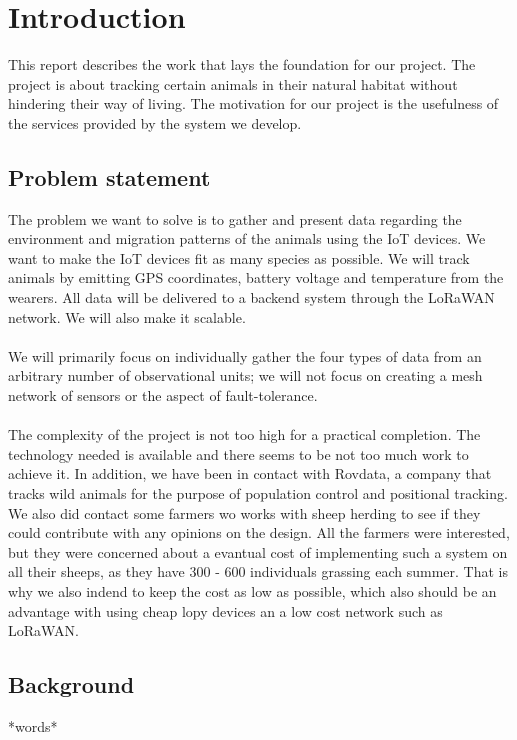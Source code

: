 \tableofcontents
\listoffigures

\clearpage

\section{Introduction}
	This report describes the work that lays the foundation for our project. The project is about tracking certain animals in their natural habitat without hindering their way of living. The motivation for our project is the usefulness of the services provided by the system we develop. 
	\subsection{Problem statement}
		The problem we want to solve is to gather and present data regarding the environment and migration patterns of the animals using the IoT devices. We want to make the IoT devices fit as many species as possible. We will track animals by emitting GPS coordinates, battery voltage and temperature from the wearers. All data will be delivered to a backend system through the LoRaWAN network. We will also make it scalable. 
		\\\\
		We will primarily focus on individually gather the four types of data from an arbitrary number of observational units; we will not focus on creating a mesh network of sensors or the aspect of fault-tolerance. 
		\\\\
		The complexity of the project is not too high for a practical completion. The technology needed is available and there seems to be not too much work to achieve it. In addition, we have been in contact with Rovdata, a company that tracks wild animals for the purpose of population control and positional tracking. We also did contact some farmers wo works with sheep herding to see if they could contribute with any opinions on the design. All the farmers were interested, but they were concerned about a evantual cost of implementing such a system on all their sheeps, as they have 300 - 600 individuals grassing each summer. That is why we also indend to keep the cost as low as possible, which also should be an advantage with using cheap lopy devices an a low cost network such as LoRaWAN. 

	\subsection{Background}
		*words*
		
